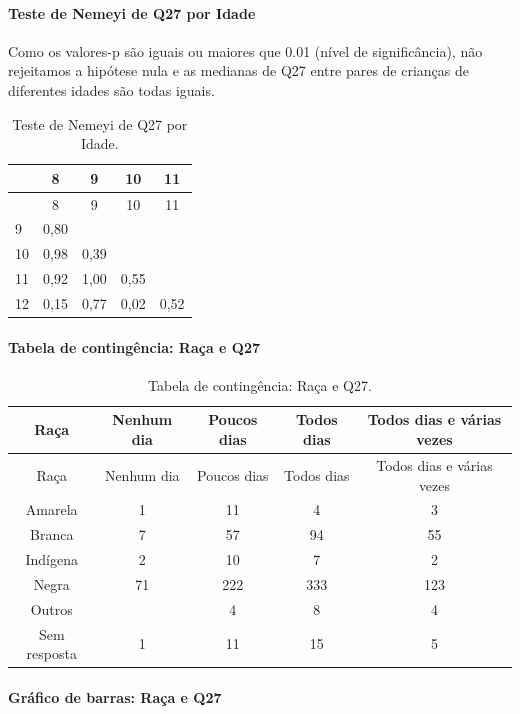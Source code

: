 \documentclass[]{article}
\let\oldparagraph\paragraph
\renewcommand{\paragraph}[1]{\oldparagraph{#1}\mbox{}}
\begin{document}
\hypertarget{teste-de-nemeyi-de-q27-por-idade}{%
\paragraph{Teste de Nemeyi de Q27 por Idade}\label{teste-de-nemeyi-de-q27-por-idade}}

Como os valores-p são iguais ou maiores que 0.01 (nível de significância), não rejeitamos a hipótese nula e as medianas de Q27 entre pares de crianças de diferentes idades são todas iguais.

\begin{longtable}[]{@{}lcccc@{}}
\caption{\label{tab:unnamed-chunk-809}Teste de Nemeyi de Q27 por Idade.}\tabularnewline
\toprule
& 8 & 9 & 10 & 11\tabularnewline
\midrule
\endfirsthead
\toprule
& 8 & 9 & 10 & 11\tabularnewline
\midrule
\endhead
9 & 0,80 & & &\tabularnewline
10 & 0,98 & 0,39 & &\tabularnewline
11 & 0,92 & 1,00 & 0,55 &\tabularnewline
12 & 0,15 & 0,77 & 0,02 & 0,52\tabularnewline
\bottomrule
\end{longtable}

\cleardoublepage

\hypertarget{tabela-de-continguxeancia-rauxe7a-e-q27}{%
\paragraph{Tabela de contingência: Raça e Q27}\label{tabela-de-continguxeancia-rauxe7a-e-q27}}

\begin{longtable}[]{@{}ccccc@{}}
\caption{\label{tab:unnamed-chunk-810}Tabela de contingência: Raça e Q27.}\tabularnewline
\toprule
Raça & Nenhum dia & Poucos dias & Todos dias & Todos dias e várias vezes\tabularnewline
\midrule
\endfirsthead
\toprule
Raça & Nenhum dia & Poucos dias & Todos dias & Todos dias e várias vezes\tabularnewline
\midrule
\endhead
Amarela & 1 & 11 & 4 & 3\tabularnewline
Branca & 7 & 57 & 94 & 55\tabularnewline
Indígena & 2 & 10 & 7 & 2\tabularnewline
Negra & 71 & 222 & 333 & 123\tabularnewline
Outros & & 4 & 8 & 4\tabularnewline
Sem resposta & 1 & 11 & 15 & 5\tabularnewline
\bottomrule
\end{longtable}

\hypertarget{gruxe1fico-de-barras-rauxe7a-e-q27}{%
\paragraph{Gráfico de barras: Raça e Q27}\label{gruxe1fico-de-barras-rauxe7a-e-q27}}
\end{document}
